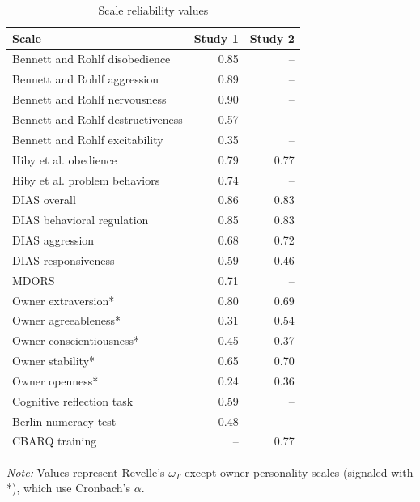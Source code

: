 \documentclass[
  pub,floatsintext]{apa6}
\begin{document}
\begin{table}[!h]

\caption{\label{tab:reliability}Scale reliability values}
\centering
\begin{threeparttable}
\begin{tabular}[t]{lrr}
\toprule
Scale & Study 1 & Study 2\\
\midrule
Bennett and Rohlf disobedience & 0.85 & --\\
Bennett and Rohlf aggression & 0.89 & --\\
Bennett and Rohlf nervousness & 0.90 & --\\
Bennett and Rohlf destructiveness & 0.57 & --\\
Bennett and Rohlf excitability & 0.35 & --\\
Hiby et al. obedience & 0.79 & 0.77\\
Hiby et al. problem behaviors & 0.74 & --\\
DIAS overall & 0.86 & 0.83\\
DIAS behavioral regulation & 0.85 & 0.83\\
DIAS aggression & 0.68 & 0.72\\
DIAS responsiveness & 0.59 & 0.46\\
MDORS & 0.71 & --\\
Owner extraversion* & 0.80 & 0.69\\
Owner agreeableness* & 0.31 & 0.54\\
Owner conscientiousness* & 0.45 & 0.37\\
Owner stability* & 0.65 & 0.70\\
Owner openness* & 0.24 & 0.36\\
Cognitive reflection task & 0.59 & --\\
Berlin numeracy test & 0.48 & --\\
CBARQ training & -- & 0.77\\
\bottomrule
\end{tabular}
\begin{tablenotes}
\item \newline\textit{Note: }  Values represent Revelle's $\omega_{T}$ except owner personality scales (signaled with *), which use Cronbach's $\alpha$. 
\end{tablenotes}
\end{threeparttable}
\end{table}

\clearpage
\end{document}

